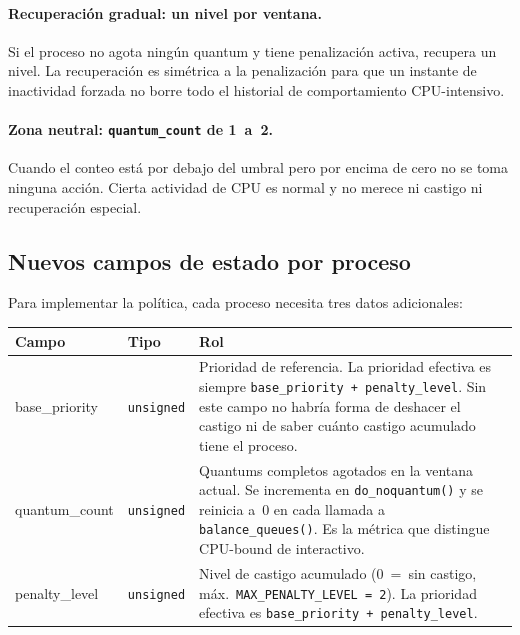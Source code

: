 \documentclass[11pt,a4paper]{article}
\begin{document}
\paragraph{Recuperaci\'on gradual: un nivel por ventana.}
Si el proceso no agota ning\'un quantum y tiene penalizaci\'on activa, recupera un
nivel. La recuperaci\'on es sim\'etrica a la penalizaci\'on para que un instante de
inactividad forzada no borre todo el historial de comportamiento CPU-intensivo.

\paragraph{Zona neutral: \texttt{quantum\_count} de 1~a~2.}
Cuando el conteo est\'a por debajo del umbral pero por encima de cero no se toma
ninguna acci\'on. Cierta actividad de CPU es normal y no merece ni castigo ni
recuperaci\'on especial.

\subsection{Nuevos campos de estado por proceso}

Para implementar la pol\'itica, cada proceso necesita tres datos adicionales:

\begin{center}
\begin{tabularx}{\textwidth}{>{\ttfamily}l l X}
\toprule
\normalfont\textbf{Campo} & \textbf{Tipo} & \textbf{Rol} \\
\midrule
base\_priority &
  \texttt{unsigned} &
  Prioridad de referencia. La prioridad efectiva es siempre
  \texttt{base\_priority + penalty\_level}. Sin este campo no habr\'ia forma
  de deshacer el castigo ni de saber cu\'anto castigo acumulado tiene el proceso. \\[6pt]
quantum\_count &
  \texttt{unsigned} &
  Quantums completos agotados en la ventana actual. Se incrementa en
  \texttt{do\_noquantum()} y se reinicia a~0 en cada llamada a
  \texttt{balance\_queues()}. Es la m\'etrica que distingue CPU-bound de interactivo. \\[6pt]
penalty\_level &
  \texttt{unsigned} &
  Nivel de castigo acumulado (0~=~sin castigo, m\'ax.~\texttt{MAX\_PENALTY\_LEVEL = 2}).
  La prioridad efectiva es \texttt{base\_priority + penalty\_level}. \\
\bottomrule
\end{tabularx}
\end{center}

\end{document}
